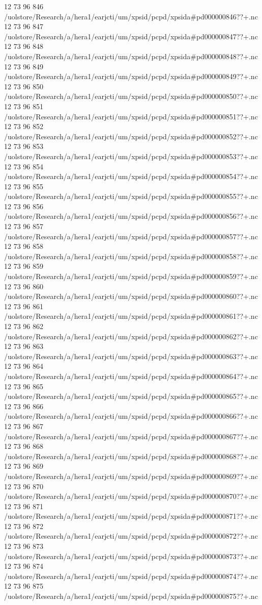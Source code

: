 12 73 96
846
/uolstore/Research/a/hera1/earjcti/um/xpsid/pcpd/xpsida#pd000000846??+.nc
12 73 96
847
/uolstore/Research/a/hera1/earjcti/um/xpsid/pcpd/xpsida#pd000000847??+.nc
12 73 96
848
/uolstore/Research/a/hera1/earjcti/um/xpsid/pcpd/xpsida#pd000000848??+.nc
12 73 96
849
/uolstore/Research/a/hera1/earjcti/um/xpsid/pcpd/xpsida#pd000000849??+.nc
12 73 96
850
/uolstore/Research/a/hera1/earjcti/um/xpsid/pcpd/xpsida#pd000000850??+.nc
12 73 96
851
/uolstore/Research/a/hera1/earjcti/um/xpsid/pcpd/xpsida#pd000000851??+.nc
12 73 96
852
/uolstore/Research/a/hera1/earjcti/um/xpsid/pcpd/xpsida#pd000000852??+.nc
12 73 96
853
/uolstore/Research/a/hera1/earjcti/um/xpsid/pcpd/xpsida#pd000000853??+.nc
12 73 96
854
/uolstore/Research/a/hera1/earjcti/um/xpsid/pcpd/xpsida#pd000000854??+.nc
12 73 96
855
/uolstore/Research/a/hera1/earjcti/um/xpsid/pcpd/xpsida#pd000000855??+.nc
12 73 96
856
/uolstore/Research/a/hera1/earjcti/um/xpsid/pcpd/xpsida#pd000000856??+.nc
12 73 96
857
/uolstore/Research/a/hera1/earjcti/um/xpsid/pcpd/xpsida#pd000000857??+.nc
12 73 96
858
/uolstore/Research/a/hera1/earjcti/um/xpsid/pcpd/xpsida#pd000000858??+.nc
12 73 96
859
/uolstore/Research/a/hera1/earjcti/um/xpsid/pcpd/xpsida#pd000000859??+.nc
12 73 96
860
/uolstore/Research/a/hera1/earjcti/um/xpsid/pcpd/xpsida#pd000000860??+.nc
12 73 96
861
/uolstore/Research/a/hera1/earjcti/um/xpsid/pcpd/xpsida#pd000000861??+.nc
12 73 96
862
/uolstore/Research/a/hera1/earjcti/um/xpsid/pcpd/xpsida#pd000000862??+.nc
12 73 96
863
/uolstore/Research/a/hera1/earjcti/um/xpsid/pcpd/xpsida#pd000000863??+.nc
12 73 96
864
/uolstore/Research/a/hera1/earjcti/um/xpsid/pcpd/xpsida#pd000000864??+.nc
12 73 96
865
/uolstore/Research/a/hera1/earjcti/um/xpsid/pcpd/xpsida#pd000000865??+.nc
12 73 96
866
/uolstore/Research/a/hera1/earjcti/um/xpsid/pcpd/xpsida#pd000000866??+.nc
12 73 96
867
/uolstore/Research/a/hera1/earjcti/um/xpsid/pcpd/xpsida#pd000000867??+.nc
12 73 96
868
/uolstore/Research/a/hera1/earjcti/um/xpsid/pcpd/xpsida#pd000000868??+.nc
12 73 96
869
/uolstore/Research/a/hera1/earjcti/um/xpsid/pcpd/xpsida#pd000000869??+.nc
12 73 96
870
/uolstore/Research/a/hera1/earjcti/um/xpsid/pcpd/xpsida#pd000000870??+.nc
12 73 96
871
/uolstore/Research/a/hera1/earjcti/um/xpsid/pcpd/xpsida#pd000000871??+.nc
12 73 96
872
/uolstore/Research/a/hera1/earjcti/um/xpsid/pcpd/xpsida#pd000000872??+.nc
12 73 96
873
/uolstore/Research/a/hera1/earjcti/um/xpsid/pcpd/xpsida#pd000000873??+.nc
12 73 96
874
/uolstore/Research/a/hera1/earjcti/um/xpsid/pcpd/xpsida#pd000000874??+.nc
12 73 96
875
/uolstore/Research/a/hera1/earjcti/um/xpsid/pcpd/xpsida#pd000000875??+.nc
